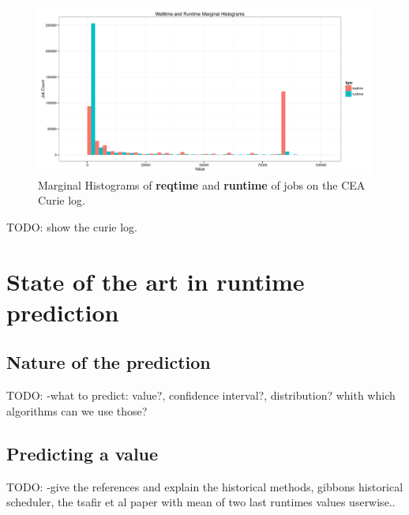 \documentclass{article}
\begin{document}
\begin{figure}[H]
        \centering
        \includegraphics[width=\textwidth/3]{../../wallimage-0.png}
        \caption{Marginal Histograms of \textbf{reqtime} and \textbf{runtime} of jobs on the CEA Curie log.}
        \label{fig:_wall_run_for_report_pdf}
\end{figure}





TODO: show the curie log.



\section{State of the art in \textbf{runtime} prediction}


\subsection{Nature of the prediction}
\label{sub:nature_of_the_prediction}

TODO: -what to predict: value?, confidence interval?, distribution? whith which algorithms can we use those?


\subsection{Predicting a value}
\label{sub:predicting_a_value}

TODO: -give the references and explain the historical methods, gibbons historical scheduler, the tsafir et al paper with mean of two last runtimes values userwise..

\end{document}
